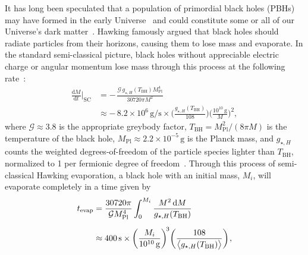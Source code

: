 It has long been speculated that a population of primordial black holes (PBHs) may have formed in the early Universe~\cite{Zeldovich:1967lct, Hawking:1971ei} and could constitute some or all of our Universe's dark matter~\cite{Chapline:1975ojl, Meszaros:1975ef}. Hawking famously argued that black holes should radiate particles from their horizons, causing them to lose mass and evaporate. In the standard semi-classical picture, black holes without appreciable electric charge or angular momentum lose mass through this process at the following rate~\cite{Hawking:1975vcx}:
%
\begin{align}
\label{eq:ch10-SC}
    \frac{\mathrm{d}M}{\mathrm{d}t}\bigg|_\mathrm{SC}
        &=
            -\mspace{2mu}\frac{\mathcal{G}\,g_{\star, H}(T_\mathrm{BH}) M_\mathrm{Pl}^{4}}{30720 \pi M^{2}}\\
        &\approx
            -\,8.2 \times 10^{6}\,\mathrm{g/s} \times\! \bigg(\frac{g_{\star, H}(T_\mathrm{BH})}{108}\bigg)\!\bigg(\frac{10^{10}\,\mathrm{g}}{M}\bigg)^{\!2}, \nonumber
\end{align}
%
where $\mathcal{G} \approx 3.8$ is the appropriate greybody factor, $T_\mathrm{BH} = M^{2}_\mathrm{Pl}/(8\pi M)$ is the temperature of the black hole, $M_\mathrm{Pl} \approx 2.2 \times 10^{-5}\,\mathrm{g}$ is the Planck mass, and $g_{\star, H}$ counts the weighted degrees-of-freedom of the particle species lighter than $T_\mathrm{BH}$, normalized to 1 per fermionic degree of freedom~\cite{MacGibbon:1990zk, MacGibbon:1991tj}. Through this process of semi-classical Hawking evaporation, a black hole with an initial mass, $M_{i}$, will evaporate completely in a time given by
%
\begin{align}
\label{eq:ch10-tevap}
    t_\mathrm{evap}
        &=
            \frac{30720 \pi}{\mathcal{G} M^{4}_\mathrm{Pl}} \int_{0}^{M_{i}} \frac{M^{2}\, \mathrm{d}M}{g_{\star, H}(T_\mathrm{BH})}\\[2mm]
        &\approx
            400\,\mathrm{s} \times \bigg(\frac{M_{i}}{10^{10}\,\mathrm{g}}\bigg)^{\!3} \bigg(\frac{108}{\big\langle g_{\star, H}(T_\mathrm{BH})\big\rangle}\bigg)\mspace{1.5mu} , \nonumber
\end{align}
%

